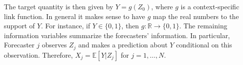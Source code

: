 \documentclass[11pt]{article}
\newcommand{\R}{\mathbb{R}}
\newcommand{\E}{\mathbb{E}}
\theoremstyle{definition}
\theoremstyle{definition}
\def\bSigma{{\bf \Sigma}}
\def\E{{\mathbb E}}
\def\diag{\text{diag}}
\def\diag{\text{diag}}
\begin{document}
The target quantity is then given by $Y = g(Z_0)$, where $g$ is a context-specific link function. In general it makes sense to have $g$ map the real numbers to the support of $Y$. For instance, if $Y \in \{0,1\}$, then $g : \R \to \{0,1\}$.
 The remaining information variables summarize the forecasters' information. In particular, Forecaster $j$ observes $Z_j$ and makes a prediction about $Y$ conditional on this observation. Therefore, $X_j= \E[Y | Z_j]$ for $j = 1, \dots, N$. 
\end{document}
